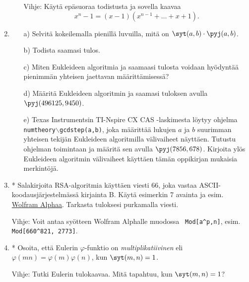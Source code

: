 \begin{enumerate}
\begin{itemize}
Vihje: Käytä epäsuoraa todistusta ja sovella kaavaa
\[
x^n-1 = (x-1)(x^{n-1}+\ldots+x+1).
\]
\end{itemize}

\item
\begin{itemize}
\item[a)] Selvitä kokeilemalla pienillä luvuilla, mitä on
$\syt(a,b)\cdot \pyj(a,b)$.
\item[b)] Todista saamasi tulos.
\item[c)] Miten Eukleideen algoritmia ja saamaasi tulosta voidaan
hyödyntää pienimmän yhteisen jaettavan määrittämisessä?
\item[d)] Määritä Eukleideen algoritmin ja saamasi tuloksen
avulla $\pyj(496125,9450)$.
\item[e)] Texas Instrumentsin TI-Nspire CX CAS -laskimesta löytyy
ohjelma {\tt numtheory$\backslash$gcdstep(a,b)}, joka määrittää
lukujen $a$ ja $b$ suurimman yhteisen tekijän Eukleideen
algoritmilla välivaiheet näyttäen. Tutustu ohjelman toimintaan ja
määritä sen avulla $\pyj(7856,678)$. Kirjoita ylös Eukleideen
algoritmin välivaiheet käyttäen tämän oppikirjan mukaisia
merkintöjä.
\end{itemize}

\item * %
Salakirjoita RSA-algoritmia käyttäen
viesti $66$, joka vastaa ASCII-koodausjärjestelmässä kirjainta
B. Käytä esimerkin 7 avainta ja esim. \href{http://
www.wolframalpha.com}{Wolfram Alphaa}. Tarkasta tuloksesi
purkamalla viesti.

Vihje: Voit antaa syötteen Wolfram Alphalle muodossa {\tt
Mod[a\^{}p,n]}, esim. {\tt Mod[660\^{}821, 2773]}.

\item * %
Osoita, että Eulerin $\varphi$-funktio
on {\em multiplikatiivinen} eli $\varphi(mn) = \varphi(m)
\varphi(n)$, kun $\syt(m,n)=1$.

Vihje: Tutki Eulerin tulokaavaa. Mitä tapahtuu, kun $\syt(m,n)
=1$?

\end{enumerate}

